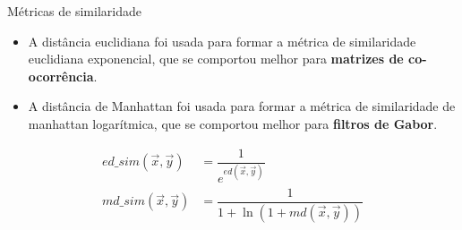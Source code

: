 \documentclass{templatebeamerufc/libs/ufc_format}
\begin{document}
\begin{frame}{Métricas de similaridade}
  \begin{itemize}
  \item A distância euclidiana foi usada
    para formar a métrica de similaridade euclidiana exponencial, que se
    comportou melhor para \textbf{matrizes de co-ocorrência}.
   \item A distância de Manhattan foi usada para formar a métrica de
     similaridade de manhattan logarítmica, que se comportou melhor para
     \textbf{filtros de Gabor}.
  \end{itemize}

  \begin{equation*}\label{eq:similaridades}
    \begin{aligned}
      ed\_sim(\vec{x}, \vec{y}) &= \dfrac{1}{e^{ed(\vec{x}, \vec{y})}} \\
      md\_sim(\vec{x}, \vec{y}) &= \dfrac{1}{1 + \ln(1 + md(\vec{x}, \vec{y}))}
    \end{aligned}
  \end{equation*}

\end{frame}
\end{document}

